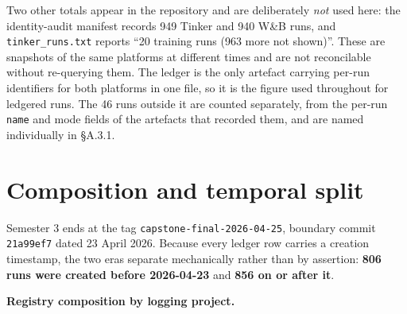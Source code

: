 \documentclass[12pt,a4paper]{report}
\begin{document}
Two other totals appear in the repository and are deliberately
\emph{not} used here: the identity-audit manifest records 949 Tinker and
940 W\&B runs, and \texttt{tinker\_runs.txt} reports ``20 training runs
(963 more not shown)''. These are snapshots of the same platforms at
different times and are not reconcilable without re-querying them. The
ledger is the only artefact carrying per-run identifiers for both
platforms in one file, so it is the figure used throughout for ledgered
runs. The 46 runs outside it are counted separately, from the per-run
\texttt{name} and mode fields of the artefacts that recorded them, and
are named individually in §A.3.1.

\section{Composition and temporal
split}\label{composition-and-temporal-split}

Semester 3 ends at the tag \texttt{capstone-final-2026-04-25}, boundary
commit \texttt{21a99ef7} dated 23 April 2026. Because every ledger row
carries a creation timestamp, the two eras separate mechanically rather
than by assertion: \textbf{806 runs were created before 2026-04-23} and
\textbf{856 on or after it}.

\textbf{Registry composition by logging project.}
\end{document}
